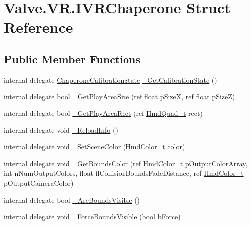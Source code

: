 \hypertarget{struct_valve_1_1_v_r_1_1_i_v_r_chaperone}{}\section{Valve.\+V\+R.\+I\+V\+R\+Chaperone Struct Reference}
\label{struct_valve_1_1_v_r_1_1_i_v_r_chaperone}
\subsection*{Public Member Functions}
\begin{DoxyCompactItemize}
\item 
internal delegate \mbox{\hyperlink{namespace_valve_1_1_v_r_ab893e8e2bf198a8cb4d2a2cd9c545c32}{Chaperone\+Calibration\+State}} \mbox{\hyperlink{struct_valve_1_1_v_r_1_1_i_v_r_chaperone_ae940ed5f0954e57503fd3c59e6a52bbd}{\+\_\+\+Get\+Calibration\+State}} ()
\item 
internal delegate bool \mbox{\hyperlink{struct_valve_1_1_v_r_1_1_i_v_r_chaperone_a2eada0fcf01f701837846219447de33d}{\+\_\+\+Get\+Play\+Area\+Size}} (ref float p\+SizeX, ref float p\+SizeZ)
\item 
internal delegate bool \mbox{\hyperlink{struct_valve_1_1_v_r_1_1_i_v_r_chaperone_a489fd7799318412b5ecf95dba2dadc6a}{\+\_\+\+Get\+Play\+Area\+Rect}} (ref \mbox{\hyperlink{struct_valve_1_1_v_r_1_1_hmd_quad__t}{Hmd\+Quad\+\_\+t}} rect)
\item 
internal delegate void \mbox{\hyperlink{struct_valve_1_1_v_r_1_1_i_v_r_chaperone_a8de5e80b3169e3fa61c6bed940006796}{\+\_\+\+Reload\+Info}} ()
\item 
internal delegate void \mbox{\hyperlink{struct_valve_1_1_v_r_1_1_i_v_r_chaperone_ac52b4f817e60c163ab42c6fbe71cd116}{\+\_\+\+Set\+Scene\+Color}} (\mbox{\hyperlink{struct_valve_1_1_v_r_1_1_hmd_color__t}{Hmd\+Color\+\_\+t}} color)
\item 
internal delegate void \mbox{\hyperlink{struct_valve_1_1_v_r_1_1_i_v_r_chaperone_a57187a62a05e7c3b6e31254db3608027}{\+\_\+\+Get\+Bounds\+Color}} (ref \mbox{\hyperlink{struct_valve_1_1_v_r_1_1_hmd_color__t}{Hmd\+Color\+\_\+t}} p\+Output\+Color\+Array, int n\+Num\+Output\+Colors, float fl\+Collision\+Bounds\+Fade\+Distance, ref \mbox{\hyperlink{struct_valve_1_1_v_r_1_1_hmd_color__t}{Hmd\+Color\+\_\+t}} p\+Output\+Camera\+Color)
\item 
internal delegate bool \mbox{\hyperlink{struct_valve_1_1_v_r_1_1_i_v_r_chaperone_a289d2c423a5d733af2043862b4540305}{\+\_\+\+Are\+Bounds\+Visible}} ()
\item 
internal delegate void \mbox{\hyperlink{struct_valve_1_1_v_r_1_1_i_v_r_chaperone_a39b5cfdb71537a5db356ab1783035fae}{\+\_\+\+Force\+Bounds\+Visible}} (bool b\+Force)
\end{DoxyCompactItemize}
